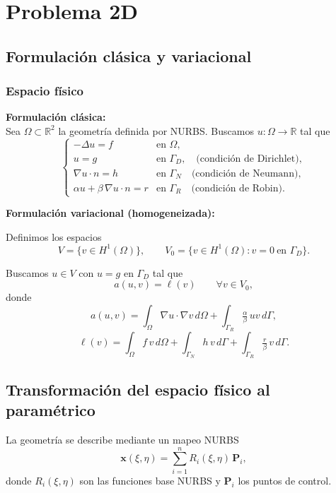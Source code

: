 \documentclass[12pt]{article}
\begin{document}
\section{Problema 2D}
\subsection{Formulación clásica y variacional}
\subsubsection*{Espacio físico}
\medskip
\textbf{Formulación clásica:\\}
    Sea $\Omega \subset \mathbb{R}^2$ la geometría definida por NURBS. 
Buscamos $u : \Omega \to \mathbb{R}$ tal que
\[
\begin{cases}
- \Delta u = f & \text{en } \Omega, \\[6pt]
u = g & \text{en } \Gamma_D, \quad \text{(condición de Dirichlet)}, \\[6pt]
\nabla u \cdot n = h & \text{en } \Gamma_N \quad \text{(condición de Neumann)}, \\[6pt]
\alpha u + \beta \, \nabla u \cdot n = r & \text{en } \Gamma_R 
\quad \text{(condición de Robin)}.
\end{cases}
\]


\medskip

\textbf{Formulación variacional (homogeneizada):}

Definimos los espacios
\[
V = \{ v \in H^1(\Omega) \}, 
\qquad 
V_0 = \{ v \in H^1(\Omega) : v=0 \ \text{en } \Gamma_D \}.
\]

Buscamos $u \in V$ con $u=g$ en $\Gamma_D$ tal que
\[
a(u,v) = \ell(v) \qquad \forall v \in V_0,
\]
donde
\[
a(u,v) = \int_\Omega \nabla u \cdot \nabla v \, d\Omega
          + \int_{\Gamma_R} \tfrac{\alpha}{\beta}\, u v \, d\Gamma,
\]
\[
\ell(v) = \int_\Omega f \, v \, d\Omega 
          + \int_{\Gamma_N} h \, v \, d\Gamma
          + \int_{\Gamma_R} \tfrac{r}{\beta}\, v \, d\Gamma.
\]

\subsection{Transformación del espacio físico al paramétrico}

La geometría se describe mediante un mapeo NURBS
\[
\mathbf{x}(\xi,\eta) = \sum_{i=1}^{n} R_i(\xi,\eta)\, \mathbf{P}_i,
\]
donde $R_i(\xi,\eta)$ son las funciones base NURBS y $\mathbf{P}_i$ los 
puntos de control.
\end{document}
